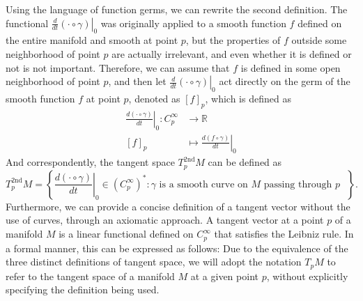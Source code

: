 \documentclass{report}
\begin{document}
Using the language of function germs, we can rewrite the second definition. The functional $\left.\frac{d}{dt}(\cdot \circ \gamma)\right|_0$ was originally applied to a smooth function $f$ defined on the entire manifold and smooth at point $p$, but the properties of $f$ outside some neighborhood of point $p$ are actually irrelevant, and even whether it is defined or not is not important. Therefore, we can assume that $f$ is defined in some open neighborhood of point $p$, and then let $\left.\frac{d}{dt}(\cdot \circ \gamma)\right|_0$ act directly on the germ of the smooth function $f$ at point $p$, denoted as $[f]_p$, which is defined as
\[
    \begin{aligned}
        \left.\frac{d(\cdot \circ \gamma)}{dt}\right|_0:C^\infty_p&\longrightarrow \mathbb{R}\\
        [f]_p&\longmapsto \left.\frac{d(f \circ \gamma)}{dt}\right|_0
    \end{aligned}
\]
And correspondently, the tangent space $T^{2\mathrm{nd}}_pM$ can be defined as
\[
    T^{2\mathrm{nd}}_pM=\left\{\left.\frac{d(\cdot \circ \gamma)}{dt}\right|_0\in \left(C^{\infty}_p\right)^*:\gamma\text{ is a smooth curve on $M$ passing through $p$ }\right\}.
\]
Furthermore, we can provide a concise definition of a tangent vector without the use of curves, through an axiomatic approach. A tangent vector at a point $p$ of a manifold $M$ is a linear functional defined on $C^\infty_p$ that satisfies the Leibniz rule. In a formal manner, this can be expressed as follows:
Due to the equivalence of the three distinct definitions of tangent space, we will adopt the notation $T_pM$ to refer to the tangent space of a manifold $M$ at a given point $p$, without explicitly specifying the definition being used.
\end{document}

